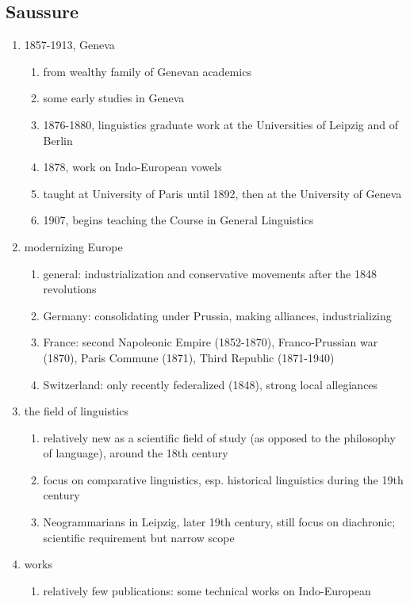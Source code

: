 \documentclass[12pt]{article}
\begin{document}
\subsection{Saussure}

\begin{enumerate}
\item 1857-1913, Geneva
    \begin{enumerate}
    \item from wealthy family of Genevan academics
    \item some early studies in Geneva
    \item 1876-1880, linguistics graduate work at the Universities of Leipzig and of Berlin
    \item 1878, work on Indo-European vowels
    \item taught at University of Paris until 1892, then at the University of Geneva
    \item 1907, begins teaching the Course in General Linguistics
    \end{enumerate}
\item modernizing Europe
    \begin{enumerate}
    \item general: industrialization and conservative movements after the 1848 revolutions
    \item Germany: consolidating under Prussia, making alliances, industrializing
    \item France: second Napoleonic Empire (1852-1870), Franco-Prussian war (1870), Paris Commune (1871), Third Republic (1871-1940)
    \item Switzerland: only recently federalized (1848), strong local allegiances
    \end{enumerate}
\item the field of linguistics
    \begin{enumerate}
    \item relatively new as a scientific field of study (as opposed to the philosophy of language), around the 18th century
    \item focus on comparative linguistics, esp. historical linguistics during the 19th century
    \item Neogrammarians in Leipzig, later 19th century, still focus on diachronic; scientific requirement but narrow scope
    \end{enumerate}
\item works
    \begin{enumerate}
    \item relatively few publications: some technical works on Indo-European

\end{enumerate}
\end{enumerate}
\end{document}
